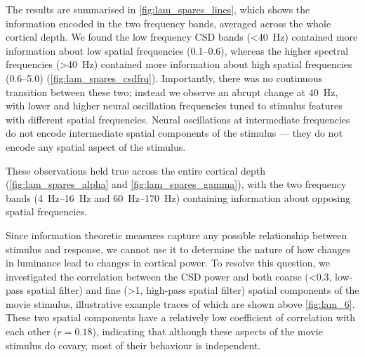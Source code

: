 The results are summarised in \autoref{fig:lam_spares_lines}, which shows the information encoded in the two frequency bands, averaged across the whole cortical depth.
We found the low frequency \ac{CSD} bands (\SI{<40}{Hz}) contained more information about low spatial frequencies (\SIrange{0.1}{0.6}{\cpd}), whereas the higher spectral frequencies (\SI{>40}{Hz}) contained more information about high spatial frequencies (\SIrange{0.6}{5.0}{\cpd}) (\autoref{fig:lam_spares_csdfrq}).
Importantly, there was no continuous transition between these two; instead we observe an abrupt change at \SI{40}{Hz}, with lower and higher neural oscillation frequencies tuned to stimulus features with different spatial frequencies.
Neural oscillations at intermediate frequencies do not encode intermediate spatial components of the stimulus --- they do not encode any spatial aspect of the stimulus.

These observations held true across the entire cortical depth (\autoref{fig:lam_spares_alpha} and \autoref{fig:lam_spares_gamma}), with the two frequency bands (\SIrange{4}{16}{Hz} and \SIrange{60}{170}{Hz}) containing information about opposing spatial frequencies.

Since information theoretic measures capture any possible relationship between stimulus and response, we cannot use it to determine the nature of how changes in luminance lead to changes in cortical power.
To resolve this question, we investigated the correlation between the \ac{CSD} power and both coarse (\SI{<0.3}{\cpd}, low-pass spatial filter) and fine (\SI{>1}{\cpd}, high-pass spatial filter) spatial components of the movie stimulus, illustrative example traces of which are shown above \autoref{fig:lam_6}.
These two spatial components have a relatively low coefficient of correlation with each other ($r=0.18$), indicating that although these aspects of the movie stimulus do covary, most of their behaviour is independent.

